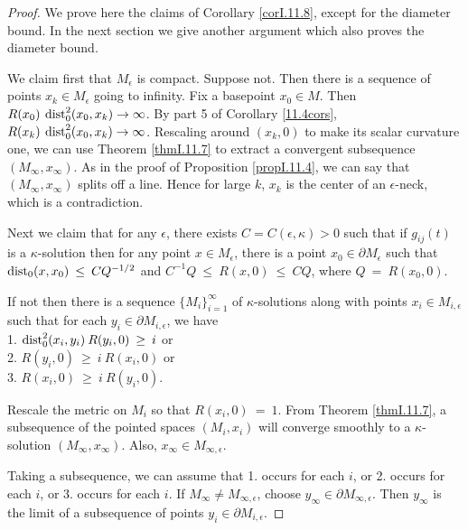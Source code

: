 \begin{proof}
We  prove here the claims of
Corollary \ref{corI.11.8}, except for the
diameter bound. In the next section we give another argument which
also proves the diameter bound.

We claim first that $M_\epsilon$ is compact.  Suppose not.
Then there is a sequence of points $x_k \in M_\epsilon$ going to
infinity. Fix a basepoint $x_0 \in M$. Then
$R(x_0) \: \operatorname{dist}_0^2(x_0, x_k) \rightarrow \infty$. By
part 5 of Corollary \ref{11.4cors},
$R(x_k) \: \operatorname{dist}_0^2(x_0, x_k) \rightarrow \infty$.  Rescaling
around $(x_k, 0)$ to make its scalar curvature one, we can use
Theorem \ref{thmI.11.7} to extract a convergent subsequence
$(M_\infty, x_\infty)$.
As in the proof of Proposition \ref{propI.11.4}, we can say that
$(M_\infty, x_\infty)$ splits off a line.  Hence for large $k$,
$x_k$ is the center of an $\epsilon$-neck, which is a contradiction.

Next we claim that for any $\epsilon$, there exists
$C = C(\epsilon, \kappa) > 0$ such that if $g_{ij}(t)$ is a $\kappa$-solution
then for
any point $x \in M_\epsilon$, there is a point $x_0 \in
\partial M_\epsilon$ such that $\operatorname{dist}_0(x, x_0) \: \le \: CQ^{-1/2}$
and $C^{-1} Q \: \le \: R(x, 0) \: \le \: CQ$, where
$Q \: = \: R(x_0, 0)$.

If not then there is a sequence $\{M_i\}_{i=1}^\infty$
of $\kappa$-solutions along with points
$x_i \in M_{i,\epsilon}$ such that for each $y_i \in
\partial M_{i,\epsilon}$, we have \\
1. $\operatorname{dist}_0^2(x_i, y_i) \: R(y_i, 0) \: \ge \: i$ or \\
2. $R(y_i, 0) \: \ge \: i \: R(x_i, 0)$ or \\
3. $R(x_i, 0) \: \ge \: i \: R(y_i, 0)$.

Rescale the metric on $M_i$ so that $R(x_i, 0) \: = \: 1$. From
Theorem \ref{thmI.11.7}, a subsequence of the pointed spaces
$(M_i, x_i)$ will converge smoothly to a $\kappa$-solution
$(M_\infty, x_\infty)$. Also, $x_\infty \in M_{\infty, \epsilon}$.

Taking a subsequence, we
can assume that 1. occurs for each $i$, or 2. occurs for each $i$,
or 3. occurs for each $i$. If $M_\infty \neq M_{\infty, \epsilon}$,
choose $y_\infty \in
\partial M_{\infty,\epsilon}$. Then $y_\infty$ is the limit of
a subsequence of points $y_i \in \partial M_{i,\epsilon}$.


\end{proof}
